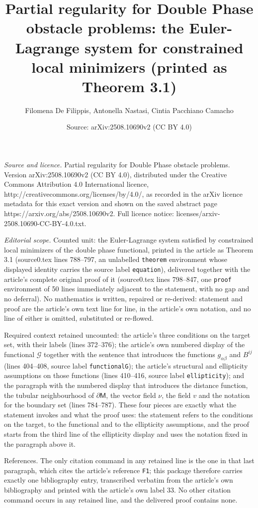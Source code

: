 \documentclass[10pt,a4paper]{amsart}
\title[Partial regularity for Double Phase obstacle problems]{Partial regularity for Double Phase obstacle problems: the Euler-Lagrange system for constrained local minimizers (printed as Theorem 3.1)}
\author{Filomena De Filippis, Antonella Nastasi, Cintia Pacchiano Camacho}
\date{Source: arXiv:2508.10690v2 (CC BY 4.0)}
\theoremstyle{plain}
\theoremstyle{definition}
\theoremstyle{remark}
\newcommand{\mm}{\mathsf{M}}
\begin{document}
\maketitle

\noindent\emph{Source and licence.} Partial regularity for Double Phase obstacle problems. Version arXiv:2508.10690v2 (CC BY 4.0), distributed under the Creative Commons Attribution 4.0 International licence, http://creativecommons.org/licenses/by/4.0/, as recorded in the arXiv licence metadata for this exact version and shown on the saved abstract page https://arxiv.org/abs/2508.10690v2. Full licence notice: licenses/arxiv-2508.10690-CC-BY-4.0.txt.\par\smallskip

\noindent\textit{Editorial scope.} Counted unit: the Euler-Lagrange system satisfied by constrained local minimizers of the double phase functional, printed in the article as Theorem 3.1 (source0.tex lines 788--797, an unlabelled \texttt{theorem} environment whose displayed identity carries the source label \texttt{equation}), delivered together with the article's complete original proof of it (source0.tex lines 798--847, one \texttt{proof} environment of 50 lines immediately adjacent to the statement, with no gap and no deferral). No mathematics is written, repaired or re-derived: statement and proof are the article's own text line for line, in the article's own notation, and no line of either is omitted, substituted or re-flowed.

Required context retained uncounted: the article's three conditions on the target set, with their labels (lines 372--376); the article's own numbered display of the functional $\mathcal{G}$ together with the sentence that introduces the functions $g_{\alpha\beta}$ and $B^{ij}$ (lines 404--408, source label \texttt{functionalG}); the article's structural and ellipticity assumptions on those functions (lines 410--416, source label \texttt{ellipticity}); and the paragraph with the numbered display that introduces the distance function, the tubular neighbourhood of $\partial\mm$, the vector field $\nu$, the field $v$ and the notation for the boundary set (lines 784--787). These four pieces are exactly what the statement invokes and what the proof uses: the statement refers to the conditions on the target, to the functional and to the ellipticity assumptions, and the proof starts from the third line of the ellipticity display and uses the notation fixed in the paragraph above it.

References. The only citation command in any retained line is the one in that last paragraph, which cites the article's reference \texttt{F1}; this package therefore carries exactly one bibliography entry, transcribed verbatim from the article's own bibliography and printed with the article's own label 33. No other citation command occurs in any retained line, and the delivered proof contains none.
\end{document}
